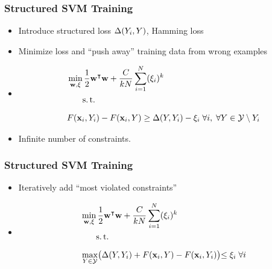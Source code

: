 \begin{frame}
    \frametitle{Structured SVM Training}
    \begin{itemize}
          \item Introduce structured loss $\Delta(Y_i, Y)$, \eg Hamming loss
          \item Minimize loss and ``push away'' training data from wrong examples
          \item[]
        \begin{align}
            &\min_{\VEC{w}, \xi} \frac{1}{2}\dualvec{w}\VEC{w} + \frac{C}{kN} \sum_{i=1}^N(\xi_i)^k
            \\ \nonumber
            &\phantom{\min_{\VEC{w}, \xi}} \st \\ \nonumber
            &F(\VEC{x}_i, Y_i) - F(\VEC{x}_i, Y) \ge \Delta(Y, Y_i) - \xi_i \; \forall i, \; \forall Y \in \mathcal{Y}\setminus Y_i 
        \end{align}
          \item Infinite number of constraints.
    \end{itemize}

\end{frame}

\begin{frame}
    \frametitle{Structured SVM Training}
    \begin{itemize}
          \item Iteratively add ``most violated constraints''
          \item[]
        \begin{align}
            &\min_{\VEC{w}, \xi} \frac{1}{2}\dualvec{w}\VEC{w} + \frac{C}{kN} \sum_{i=1}^N(\xi_i)^k
            \\ \nonumber
            &\phantom{\min_{\VEC{w}, \xi}} \st \\ \nonumber
            &\max_{Y\in\mathcal{Y}} \bigr(\Delta(Y, Y_i) + F( \VEC{x}_i, Y) - F(\VEC{x}_i, Y_i) \bigl) \le \xi_i
            \; \forall i 
        \end{align}
    \end{itemize}
    
\end{frame}

